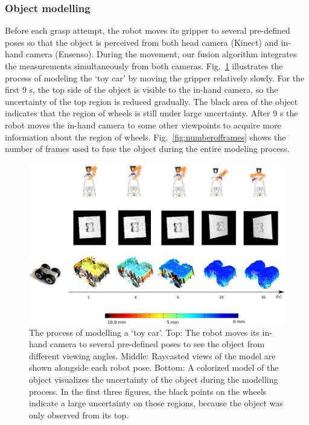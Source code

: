 \subsubsection{Object modelling}
Before each grasp attempt, the robot moves its gripper to several pre-defined poses so that the object is perceived from both head camera (Kinect) and in-hand camera (Ensenso). During the movement, our fusion algorithm integrates the measurements simultaneously from both cameras. Fig.~\ref{fig:time_evolution} illustrates the process of modeling the `toy car' by moving the gripper relatively slowly. For the first 9 s, the top side of the object is visible to the in-hand camera, so the uncertainty of the top region is reduced gradually. The black area of the object indicates that the region of wheels is still under large uncertainty. After 9 s the robot moves the in-hand camera to some other viewpoints to acquire more information about the region of wheels. Fig.~\ref{fig:numberofframes} shows the number of frames used to fuse the object during the entire modeling process.  

\begin{figure}[!htbp]
\centering
\includegraphics[width=1\linewidth]{figure/time_evolution.png}%
%
\caption{The process of modelling a `toy car'. Top: The robot moves its in-hand camera to several pre-defined poses to see the object from different viewing angles. Middle: Raycasted views of the model are shown alongside each robot pose. Bottom: A colorized model of the object visualizes the uncertainty of the object during the modelling process. In the first three figures, the black points on the wheels indicate a large uncertainty on those regions, because the object was only observed from its top.}
\label{fig:time_evolution}
\end{figure}

